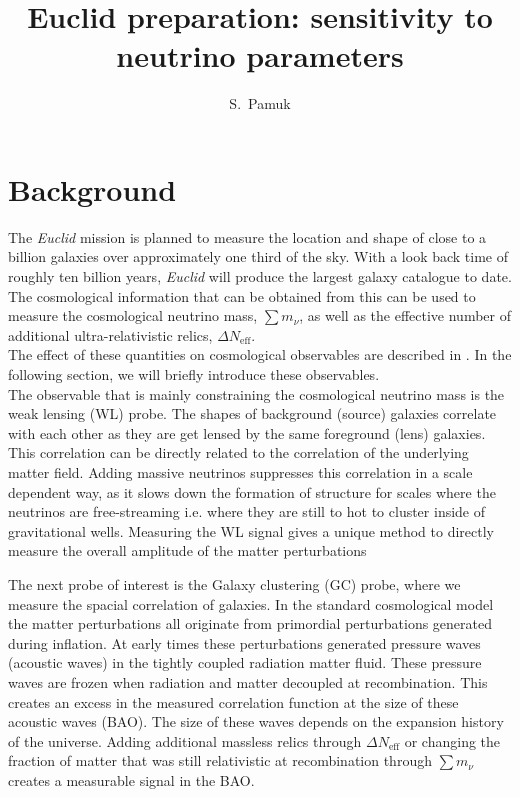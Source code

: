 \documentclass[a4paper,11pt]{article}
\title{Euclid preparation: sensitivity to neutrino parameters}
\author*[a]{S.~Pamuk}
\affiliation[a]{Instituto de Física de Cantabria (IFCA) CSIC-Univ. de Cantabria,\\ Avda. de los Castros s/n, E-39005 Santander, Spain}
\newcommand{\euclid}{\textit{Euclid}\xspace}
\newcommand{\dneff}{\Delta N_\mathrm{eff}}
\newcommand{\summnu}{\sum m_\nu}
\begin{document}
\maketitle


\section{Background}
The \euclid mission\cite{euclidcollaboration2024euclidiovervieweuclid} is planned to measure the location and shape of close to a billion galaxies over approximately one third of the sky. With a look back time of roughly ten billion years, \euclid will produce the largest galaxy catalogue to date. The cosmological information that can be obtained from this can be used to measure the cosmological neutrino mass, $\sum m_\nu$, as well as the effective number of additional ultra-relativistic relics, $\Delta N_\mathrm{eff}$.\\
The effect of these quantities on cosmological observables are described in \cite{ParticleDataGroup:2024cfk, Vagnozzi_2018, ISTF2020}. In the following section, we will briefly introduce these observables.\\
\newline
The observable that is mainly constraining the cosmological neutrino mass is the weak lensing (WL) probe.
The shapes of background (source) galaxies correlate with each other as they are get lensed by the same foreground (lens) galaxies. This correlation can be directly related to the correlation of the underlying matter field. Adding massive neutrinos suppresses this correlation in a scale dependent way, as it slows down the formation of structure for scales where the neutrinos are free-streaming i.e. where they are still to hot to cluster inside of gravitational wells.
Measuring the WL signal gives a unique method to directly measure the overall amplitude of the matter perturbations   

The next probe of interest is the Galaxy clustering (GC) probe, where we measure the spacial correlation of galaxies. In the standard cosmological model the matter perturbations all originate from primordial perturbations generated during inflation. At early times these perturbations generated pressure waves (acoustic waves) in the tightly coupled radiation matter fluid. These pressure waves are frozen when radiation and matter decoupled at recombination. This creates an excess in the measured correlation function at the size of these acoustic waves (BAO). The size of these waves depends on the expansion history of the universe. Adding additional massless relics through $\dneff$ or changing the fraction of matter that was still relativistic at recombination through $\summnu$ creates a measurable signal in the BAO.
\end{document}
